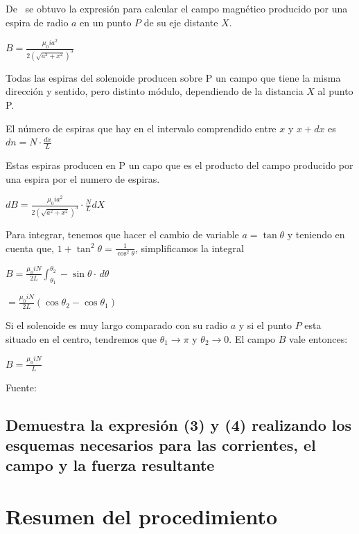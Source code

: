 \documentclass[letterpaper, 12pt]{article}
\begin{document}
\begin{multicols}{2}
De~\cite{CampoElectricoPorEspira} se obtuvo la expresión para calcular el campo
magnético producido por una espira de radio $a$ en un punto $P$ de su eje
distante $X$.

	{\large $B = \displaystyle\frac{\mu_0 i a^2}{2 \left(\sqrt{a^2 + x^2}\right)^3}$}

Todas las espiras del solenoide producen sobre P un campo que tiene la misma
dirección y sentido, pero distinto módulo, dependiendo de la distancia $X$ al
punto P.

El número de espiras que hay en el intervalo comprendido entre
$x$ y $x+dx$ es $dn = N \cdot \frac{dx}{L}$

Estas espiras producen en P un capo que es el producto del campo producido por
una espira por el numero de espiras.

	{\large $dB = \frac{\mu_0 i a^2}{2 \left(\sqrt{a^2 + x^2}\right)^3} \cdot \frac{N}{L} dX$}

Para integrar, tenemos que hacer el cambio de variable $a = \tan\theta$ y
teniendo en cuenta que, {\large $1 + \tan^{2}\theta = \frac{1}{\cos^{2}\theta}$},
simplificamos la integral

	{\large $B = \frac{\mu_0 i N}{2L} \int_{\theta_1}^{\theta_2} -\sin\theta \cdot \,d\theta$}

	{\large $ = \frac{\mu_0 i N}{2L} \left(\cos\theta_2 - \cos\theta_1\right)$}

Si el solenoide es muy largo comparado con su radio $a$ y si el punto $P$ esta
situado en el centro, tendremos que $\theta_1 \rightarrow \pi$ y
$\theta_2 \rightarrow 0$. El campo $B$ vale entonces:

{\large $B = \frac{\mu_0 i N}{L}$}

Fuente:~\cite{CampoElectricoSolenoide}

\subsection*{Demuestra la expresión (3) y (4) realizando los esquemas necesarios para las corrientes, el
	campo y la fuerza resultante}

\section{Resumen del procedimiento}

\end{multicols}

\newpage


\end{document}
